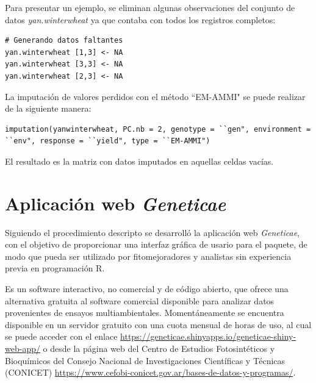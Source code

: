 Para presentar un ejemplo, se eliminan algunas observaciones del conjunto de datos \emph{yan.winterwheat} ya que contaba con todos los registros completos:

\begin{tcolorbox}[skin=bicolor,
    colframe=aurometalsaurus,colback=backcolour,colbacklower=white,
    width=1\linewidth,
    height=0.15\linewidth,
    boxsep=-3mm]
\begin{lstlisting}
# Generando datos faltantes
yan.winterwheat [1,3] <- NA
yan.winterwheat [3,3] <- NA
yan.winterwheat [2,3] <- NA
\end{lstlisting}
\end{tcolorbox}

La imputación de valores perdidos con el método ``EM-AMMI" se puede realizar de la siguiente manera:

\begin{tcolorbox}[skin=bicolor,
    colframe=aurometalsaurus,colback=backcolour,colbacklower=white,
    width=1\linewidth,
    height=0.1\linewidth,
    boxsep=-3mm]
\begin{lstlisting}
imputation(yanwinterwheat, PC.nb = 2, genotype = ``gen", environment = ``env", response = ``yield", type = ``EM-AMMI")
\end{lstlisting}
\end{tcolorbox}

El resultado es la matriz con datos imputados en aquellas celdas vacías. 


\section{Aplicación web \emph{Geneticae}}

Siguiendo el procedimiento descripto se desarrolló la aplicación web \emph{Geneticae}, con el objetivo de proporcionar una interfaz gráfica de usario para el paquete, de modo que pueda ser utilizado por fitomejoradores y analistas sin experiencia previa en programación R. 

Es un software interactivo, no comercial y de código abierto, que ofrece una alternativa gratuita al software comercial disponible para analizar datos provenientes de ensayos multiambientales. Momentáneamente se encuentra disponible en un servidor gratuito con una cuota mensual de horas de uso, al cual se puede acceder con el enlace \url{https://geneticae.shinyapps.io/geneticae-shiny-web-app/} o desde la página web del Centro de Estudios Fotosintéticos y Bioquímicos del Consejo Nacional de Investigaciones Científicas y Técnicas (CONICET) \url{https://www.cefobi-conicet.gov.ar/bases-de-datos-y-programas/}.

